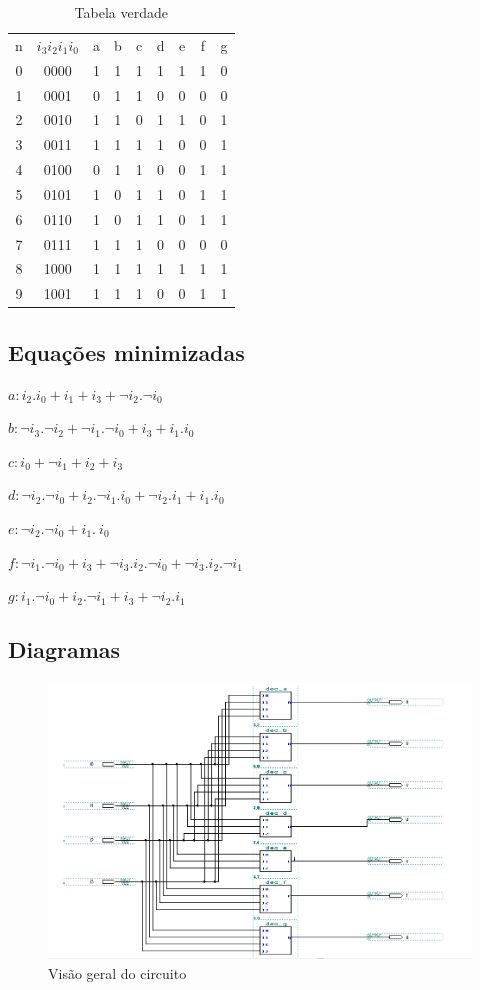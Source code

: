 \documentclass[a4paper]{article}
\begin{document}
\begin{table}[h]
\centering
\begin{tabular}{| *{9}{c |}}%
	\hline
	n\textordmasculine	&$i_3i_2i_1i_0$	&a &b &c &d &e &f &g \\
	0 &0000 &1 &1 &1 &1 &1 &1 &0 \\
	1 &0001 &0 &1 &1 &0 &0 &0 &0 \\
	2 &0010 &1 &1 &0 &1 &1 &0 &1 \\
	3 &0011 &1 &1 &1 &1 &0 &0 &1 \\
	4 &0100 &0 &1 &1 &0 &0 &1 &1 \\
	5 &0101 &1 &0 &1 &1 &0 &1 &1 \\
	6 &0110 &1 &0 &1 &1 &0 &1 &1 \\
	7 &0111 &1 &1 &1 &0 &0 &0 &0 \\
	8 &1000 &1 &1 &1 &1 &1 &1 &1 \\
	9 &1001 &1 &1 &1 &0 &0 &1 &1 \\ 
	\hline
\end{tabular}
\caption{Tabela verdade}
\end{table}

\subsection{Equações minimizadas}

$a: i_2.i_0 + i_1 + i_3 + \neg i_2.\neg i_0$

$b: \neg i_3.\neg i_2 + \neg i_1.\neg i_0 + i_3 + i_1.i_0$

$c: i_0 + \neg i_1 + i_2 + i_3$

$d: \neg i_2.\neg i_0 + i_2.\neg i_1.i_0 + \neg i_2.i_1 + i_1.i_0$

$e: \neg i_2.\neg i_0 + i_1.~i_0$

$f: \neg i_1.\neg i_0 + i_3 + \neg i_3.i_2.\neg i_0 + \neg i_3.i_2.\neg i_1$

$g: i_1.\neg i_0 + i_2.\neg i_1 + i_3 + \neg i_2.i_1$

\FloatBarrier
\subsection{Diagramas}

\begin{figure}[h!]
  \centering
  \includegraphics[scale=0.7]{dec_4-7.png}
  \caption{Visão geral do circuito}
\end{figure}
\end{document}
